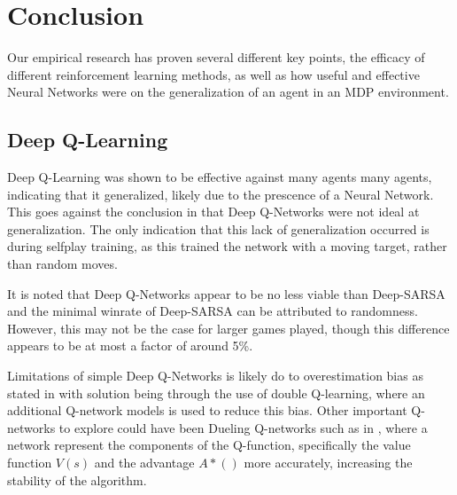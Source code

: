 \section{Conclusion}
Our empirical research has proven several different key points, the efficacy of different reinforcement learning methods, as well as how useful and effective Neural Networks were on the generalization of an agent in an MDP environment.
\subsection{Deep Q-Learning}
Deep Q-Learning was shown to be effective against many agents many agents, indicating that it generalized, likely due to the prescence of a Neural Network. This goes against the conclusion in \citet{ree13} that Deep Q-Networks were not ideal at generalization. The only indication that this lack of generalization occurred is during selfplay training, as this trained the network with a moving target, rather than random moves.

It is noted that Deep Q-Networks appear to be no less viable than Deep-SARSA and the minimal winrate of Deep-SARSA can be attributed to randomness. However, this may not be the case for larger games played, though this difference appears to be at most a factor of around 5\%.

Limitations of simple Deep Q-Networks is likely do to overestimation bias as stated in \citet{8939117} with solution being through the use of double Q-learning, where an additional Q-network models is used to reduce this bias. Other important Q-networks to explore could have been Dueling Q-networks such as in \citet{DBLP:journals/corr/abs-2106-14642}, where a network represent the components of the Q-function, specifically the value function $V(s)$ and the advantage $A*()$ more accurately, increasing the stability of the algorithm.